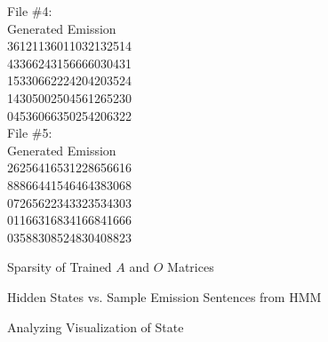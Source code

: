 \begin{subsolution}
{File \#4:\\
Generated Emission\\
36121136011032132514\\
43366243156666030431\\
15330662224204203524\\
14305002504561265230\\
04536066350254206322\\


File \#5:\\
Generated Emission\\
26256416531228656616\\
88866441546464383068\\
07265622343323534303\\
01166316834166841666\\
03588308524830408823
}\end{subsolution}
\clearpage

\indent\problem[3] %
Sparsity of Trained $A$ and $O$ Matrices
\begin{subsolution}\normalfont{
	
}\end{subsolution}
\clearpage

\indent\problem[5] %
Hidden States vs. Sample Emission Sentences from HMM

\begin{subsolution}\normalfont{
	
}\end{subsolution}
\clearpage


\indent\problem[5] %
Analyzing Visualization of State
\begin{subsolution}\normalfont{
	
}\end{subsolution}
\clearpage



